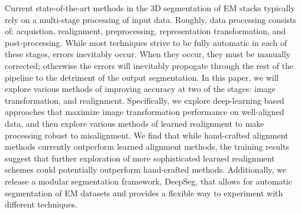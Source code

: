 Current state-of-the-art methods in the 3D segmentation of EM stacks typically rely on a multi-stage processing of input data. Roughly, data processing consists of: acquistion, realignment, preprocessing, representation transformation, and post-processing. While most techniques strive to be fully automatic in each of these stages, errors inevitably occur. When they occur, they must be manually corrected; otherwise the errors will inevitably propogate through the rest of the pipeline to the detriment of the output segmentation. In this paper, we will explore various methods of improving accuracy at two of the stages: image transformation, and realignment. Specifically, we explore deep-learning based approaches that maximize image transformation performance on well-aligned data, and then explore various methods of learned realignment to make processing robust to misalignment. We find that while hand-crafted alignment methods currently outperform learned alignment methods, the training results suggest that further exploration of more sophisticated learned realignment schemes could potentially outperform hand-crafted methods. Additionally, we release a modular segmentation framework, DeepSeg, that allows for automatic segmentation of EM datasets and provides a flexible way to experiment with different techniques.